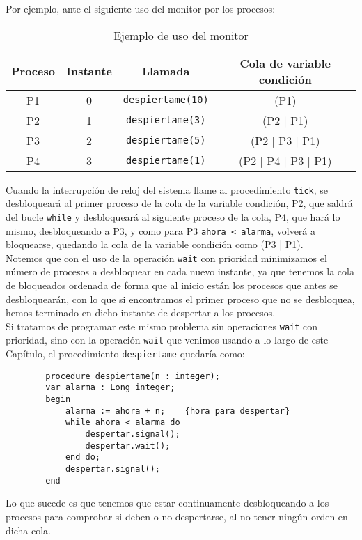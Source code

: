 \begin{ejemplo}
    Por ejemplo, ante el siguiente uso del monitor por los procesos:
    \begin{table}
    \centering
    \begin{tabular}{|c|c|c|c|}
        \hline
        Proceso & Instante & Llamada & Cola de variable condición \\
        \hline
        P1 & 0 & \verb|despiertame(10)| & (P1) \\
        \hline
        P2 & 1 & \verb|despiertame(3)| & (P2 | P1) \\
        \hline
        P3 & 2 & \verb|despiertame(5)| & (P2 | P3 | P1) \\
        \hline
        P4 & 3 & \verb|despiertame(1)| & (P2 | P4 | P3 | P1) \\
        \hline
    \end{tabular}
    \caption{Ejemplo de uso del monitor}
    \end{table}
    Cuando la interrupción de reloj del sistema llame al procedimiento \verb|tick|, se desbloqueará al primer proceso de la cola de la variable condición, P2, que saldrá del bucle \verb|while| y desbloqueará al siguiente proceso de la cola, P4, que hará lo mismo, desbloqueando a P3, y como para P3 \verb|ahora < alarma|, volverá a bloquearse, quedando la cola de la variable condición como (P3 | P1).\\

    Notemos que con el uso de la operación \verb|wait| con prioridad minimizamos el número de procesos a desbloquear en cada nuevo instante, ya que tenemos la cola de bloqueados ordenada de forma que al inicio están los procesos que antes se desbloquearán, con lo que si encontramos el primer proceso que no se desbloquea, hemos terminado en dicho instante de despertar a los procesos.\\

    Si tratamos de programar este mismo problema sin operaciones \verb|wait| con prioridad, sino con la operación \verb|wait| que venimos usando a lo largo de este Capítulo, el procedimiento \verb|despiertame| quedaría como:
    \begin{verbatim}
        procedure despiertame(n : integer);
        var alarma : Long_integer;
        begin
            alarma := ahora + n;    {hora para despertar}
            while ahora < alarma do 
                despertar.signal();
                despertar.wait();
            end do;
            despertar.signal();
        end
    \end{verbatim}
    Lo que sucede es que tenemos que estar continuamente desbloqueando a los procesos para comprobar si deben o no despertarse, al no tener ningún orden en dicha cola.
\end{ejemplo}

